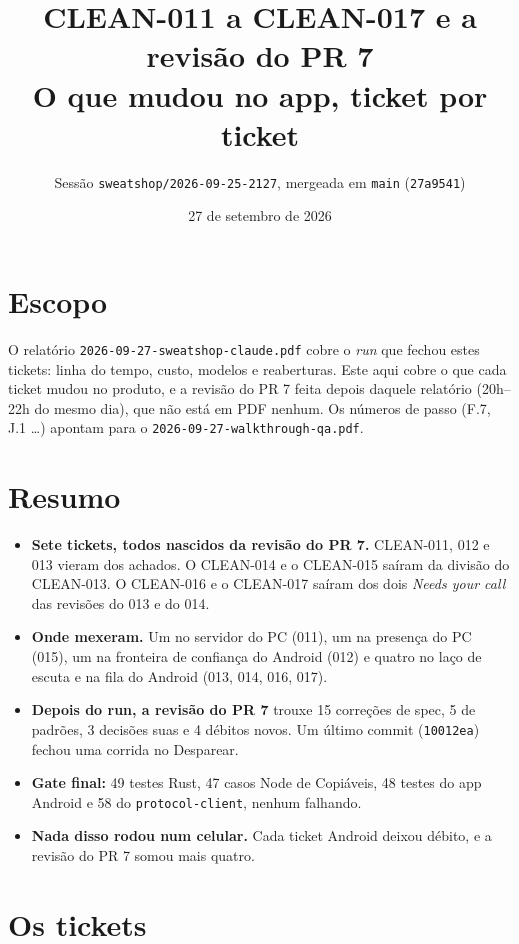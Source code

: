 \documentclass[11pt,a4paper]{article}
\title{CLEAN-011 a CLEAN-017 e a revisão do PR 7\\\large O que mudou no app, ticket por ticket}
\author{Sessão \texttt{sweatshop/2026-09-25-2127}, mergeada em \texttt{main} (\texttt{27a9541})}
\date{27 de setembro de 2026}
\begin{document}
\maketitle

\section*{Escopo}

O relatório \texttt{2026-09-27-sweatshop-claude.pdf} cobre o \emph{run} que
fechou estes tickets: linha do tempo, custo, modelos e reaberturas. Este aqui
cobre o que cada ticket mudou no produto, e a revisão do PR 7 feita depois
daquele relatório (20h--22h do mesmo dia), que não está em PDF nenhum. Os
números de passo (F.7, J.1 \dots) apontam para o
\texttt{2026-09-27-walkthrough-qa.pdf}.

\section*{Resumo}

\begin{itemize}
  \item \textbf{Sete tickets, todos nascidos da revisão do PR 7.} CLEAN-011,
        012 e 013 vieram dos achados. O CLEAN-014 e o CLEAN-015 saíram da
        divisão do CLEAN-013. O CLEAN-016 e o CLEAN-017 saíram dos dois
        \emph{Needs your call} das revisões do 013 e do 014.
  \item \textbf{Onde mexeram.} Um no servidor do PC (011), um na presença do
        PC (015), um na fronteira de confiança do Android (012) e quatro no
        laço de escuta e na fila do Android (013, 014, 016, 017).
  \item \textbf{Depois do run, a revisão do PR 7} trouxe 15 correções de spec,
        5 de padrões, 3 decisões suas e 4 débitos novos. Um último commit
        (\texttt{10012ea}) fechou uma corrida no Desparear.
  \item \textbf{Gate final:} 49 testes Rust, 47 casos Node de Copiáveis, 48
        testes do app Android e 58 do \texttt{protocol-client}, nenhum
        falhando.
  \item \textbf{Nada disso rodou num celular.} Cada ticket Android deixou
        débito, e a revisão do PR 7 somou mais quatro.
\end{itemize}

\section{Os tickets}
\end{document}
